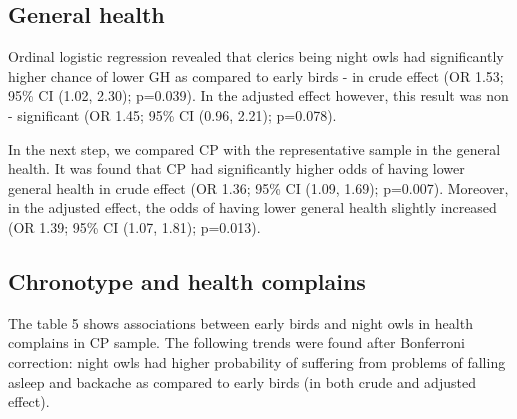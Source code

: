 \documentclass[ijerph,article,accept,moreauthors,pdftex]{mdpi}
\begin{document}
\hypertarget{general-health-1}{%
\subsection{General health}\label{general-health-1}}

Ordinal logistic regression revealed that clerics being night owls had
significantly higher chance of lower GH as compared to early birds - in
crude effect (OR 1.53; 95\% CI (1.02, 2.30); p=0.039). In the adjusted
effect however, this result was non - significant (OR 1.45; 95\% CI
(0.96, 2.21); p=0.078).

In the next step, we compared CP with the representative sample in the
general health. It was found that CP had significantly higher odds of
having lower general health in crude effect (OR 1.36; 95\% CI (1.09,
1.69); p=0.007). Moreover, in the adjusted effect, the odds of having
lower general health slightly increased (OR 1.39; 95\% CI (1.07, 1.81);
p=0.013).

\hypertarget{chronotype-and-health-complains}{%
\subsection{Chronotype and health
complains}\label{chronotype-and-health-complains}}

The table 5 shows associations between early birds and night owls in
health complains in CP sample. The following trends were found after
Bonferroni correction: night owls had higher probability of suffering
from problems of falling asleep and backache as compared to early birds
(in both crude and adjusted effect).
\end{document}
